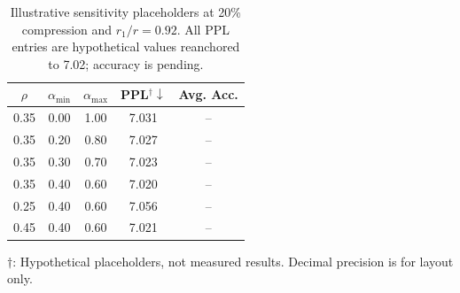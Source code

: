 \begin{table}[t]
\centering
\caption{Illustrative sensitivity placeholders at 20\% compression and $r_1/r=0.92$. All PPL entries are hypothetical values reanchored to 7.02; accuracy is pending.}
\label{tab:sensitivity-predicted-placeholder}
\begin{tabular}{ccccc}
\toprule
$\rho$ & $\alpha_{\min}$ & $\alpha_{\max}$ & PPL$^{\dagger}\downarrow$ & Avg. Acc. \\
\midrule
0.35 & 0.00 & 1.00 & 7.031 & -- \\
0.35 & 0.20 & 0.80 & 7.027 & -- \\
0.35 & 0.30 & 0.70 & 7.023 & -- \\
0.35 & 0.40 & 0.60 & 7.020 & -- \\
0.25 & 0.40 & 0.60 & 7.056 & -- \\
0.45 & 0.40 & 0.60 & 7.021 & -- \\
\bottomrule
\end{tabular}
\par\smallskip\footnotesize $\dagger$: Hypothetical placeholders, not measured results. Decimal precision is for layout only.
\end{table}
